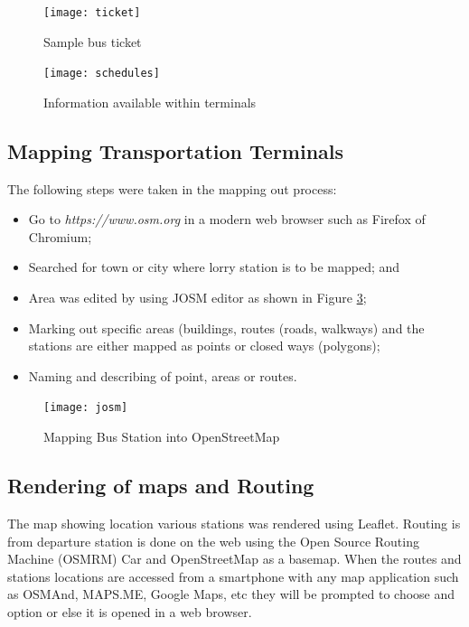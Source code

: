 \begin{figure}[H]
	\centering
	\texttt{[image: ticket]}
	\caption[Sample bus ticket]{Sample bus ticket}
	\label{fig:ticket}
\end{figure}

\begin{figure}[H]
	\centering
	\texttt{[image: schedules]}
	\caption[Information available within terminals]{Information available within terminals}
	\label{fig:schedules}
\end{figure}

\subsection{Mapping Transportation Terminals}
The following steps were taken in the mapping out process:
\begin{itemize}
	\item Go to \textit{https://www.osm.org} in a modern web browser such as Firefox of Chromium; 
	\item Searched for town or city where lorry station is to be mapped; and 
	\item Area was edited by using JOSM editor as shown in Figure \ref{fig:josm};
	\item Marking out specific areas (buildings, routes (roads, walkways) and the stations are either mapped as points or closed ways (polygons);  
	\item Naming  and describing of point, areas or routes. 
\end{itemize}

\begin{figure}[H]
	\centering
	\texttt{[image: josm]}
	\caption[Mapping Bus Station into OpenStreetMap]{Mapping Bus Station into OpenStreetMap}
	\label{fig:josm}
\end{figure}

\subsection{Rendering of maps and Routing}
The map showing location various stations was rendered using Leaflet. Routing is from departure station is done on the web using the Open Source Routing Machine (OSMRM) Car and OpenStreetMap as a basemap. When the routes and stations locations are accessed from a smartphone with any map application such as OSMAnd, MAPS.ME, Google Maps, etc they will be prompted to choose and option or else it is opened in a web browser.



